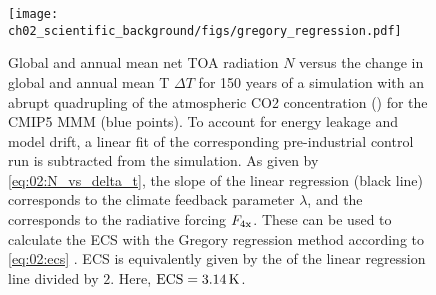 \begin{figure}[t]
  \centering
  \texttt{[image: 
    ch02\_scientific\_background/figs/gregory\_regression.pdf]}
  \caption[
    Gregory regression for the \acs{CMIP}5 \acl{MMM} illustrating the
    definition of the \acf{ECS}.
  ]{
    Global and annual mean net \acf{TOA} radiation $N$ versus the change in
    global and annual mean \acl{T} $\Delta T$ for 150 years of a simulation
    with an abrupt quadrupling of the atmospheric \acs{CO2} concentration
    () for the \acs{CMIP}5 \acl{MMM} (blue points). To account for
    energy leakage and model drift, a linear fit of the corresponding
    pre-industrial control run is subtracted from the  simulation.
    As given by \cref{eq:02:N_vs_delta_t}, the slope of the linear regression
    (black line) corresponds to the climate feedback parameter $\lambda$, and
    the \yintercept{} corresponds to the radiative forcing $F_\mathtxt{4x}$.
    These can be used to calculate the \acf{ECS} with the Gregory regression
    method according to \cref{eq:02:ecs} \autocite{Gregory2004}. \acs{ECS} is
    equivalently given by the \xintercept{} of the linear regression line
    divided by $2$. Here, $\mathtxt{ECS} = 3.14 \unit{K}$.
  }
  \label{fig:02:gregory_regression}
\end{figure}


